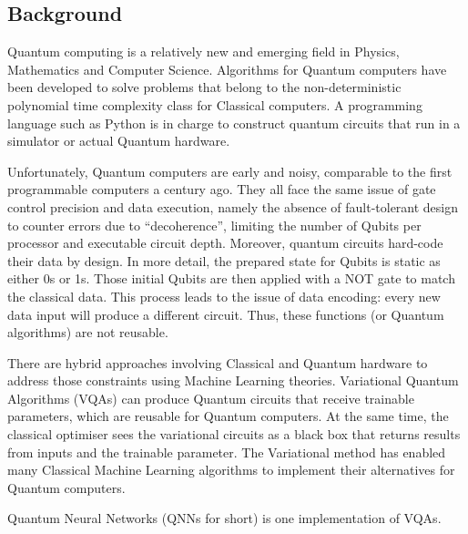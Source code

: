 \subsection{Background}
Quantum computing is a relatively new and emerging field in Physics, Mathematics and Computer Science. 
Algorithms for Quantum computers have been developed to solve problems that belong to the non-deterministic polynomial time complexity class for Classical computers. 
A programming language such as Python is in charge to construct quantum circuits that run in a simulator or actual Quantum hardware. 

Unfortunately, Quantum computers are early and noisy, comparable to the first programmable computers a century ago. 
They all face the same issue of gate control precision and data execution, namely the absence of fault-tolerant design to counter errors due to “decoherence”, limiting the number of Qubits per processor and executable circuit depth. 
Moreover, quantum circuits hard-code their data by design. In more detail, the prepared state for Qubits is static as either 0s or 1s. 
Those initial Qubits are then applied with a NOT gate to match the classical data. This process leads to the issue of data encoding: every new data input will produce a different circuit. 
Thus, these functions (or Quantum algorithms) are not reusable.

There are hybrid approaches involving Classical and Quantum hardware to address those constraints using Machine Learning theories. 
Variational Quantum Algorithms (VQAs) can produce Quantum circuits that receive trainable parameters, which are reusable for Quantum computers. 
At the same time, the classical optimiser sees the variational circuits as a black box that returns results from inputs and the trainable parameter. 
The Variational method has enabled many Classical Machine Learning algorithms to implement their alternatives for Quantum computers.

Quantum Neural Networks (QNNs for short) is one implementation of VQAs.
